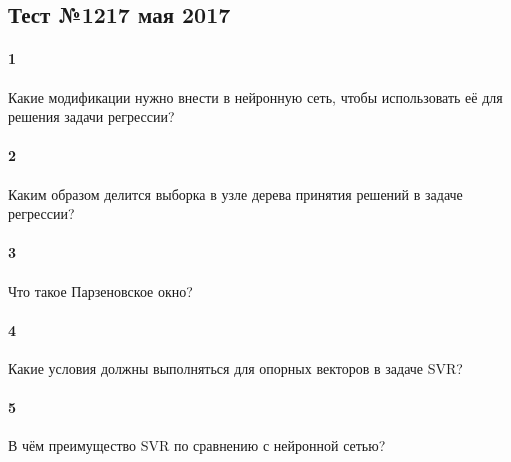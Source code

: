 \documentclass[a4paper,12pt]{article}
\begin{document}
  \subsection*{Тест №12\hfill{17 мая 2017}}

  
  \paragraph{1} Какие модификации нужно внести в нейронную сеть, чтобы использовать её для решения задачи регрессии?

  \makebox[\linewidth]{\hrulefill}
  \makebox[\linewidth]{\hrulefill}

  \paragraph{2} Каким образом делится выборка в узле дерева принятия решений в задаче регрессии?
	
  \makebox[\linewidth]{\hrulefill}
  \makebox[\linewidth]{\hrulefill}
  \makebox[\linewidth]{\hrulefill}
	
  \paragraph{3} Что такое Парзеновское окно? 

  \makebox[\linewidth]{\hrulefill}
  \makebox[\linewidth]{\hrulefill}
  \makebox[\linewidth]{\hrulefill}
  \makebox[\linewidth]{\hrulefill}

  \paragraph{4} Какие условия должны выполняться для опорных векторов в задаче SVR?

  \makebox[\linewidth]{\hrulefill}
  \makebox[\linewidth]{\hrulefill}
  \makebox[\linewidth]{\hrulefill}
  \makebox[\linewidth]{\hrulefill}

  \paragraph{5} В чём преимущество SVR по сравнению с нейронной сетью?

  \makebox[\linewidth]{\hrulefill}
  \makebox[\linewidth]{\hrulefill}
  \makebox[\linewidth]{\hrulefill}
  \makebox[\linewidth]{\hrulefill}
  \makebox[\linewidth]{\hrulefill}
 
\end{document}
